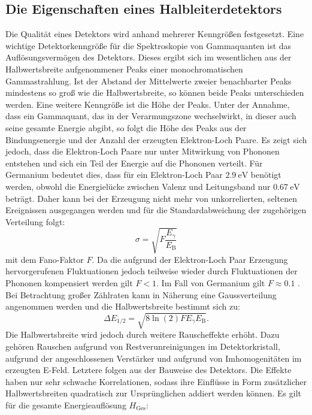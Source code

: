 \subsection{Die Eigenschaften eines Halbleiterdetektors}%
Die Qualität eines Detektors wird anhand mehrerer Kenngrößen festgesetzt.
Eine wichtige Detektorkenngröße für die Spektroskopie von Gammaquanten ist das Auflösungsvermögen des Detektors. Dieses ergibt sich im wesentlichen aus der Halbwertsbreite aufgenommener Peaks einer monochromatischen Gammastrahlung. Ist der Abstand der Mittelwerte zweier benachbarter Peaks mindestens so groß wie die Halbwertsbreite, so können beide Peaks unterschieden werden. Eine weitere Kenngröße ist die Höhe der Peaks. Unter der Annahme, dass ein Gammaquant, das in der Verarmungszone wechselwirkt, in dieser auch seine gesamte Energie abgibt, so folgt die Höhe des Peaks aus der Bindungsenergie und der Anzahl der erzeugten Elektron-Loch Paare. Es zeigt sich jedoch, dass die Elektron-Loch Paare nur unter Mitwirkung von Phononen entstehen und sich ein Teil der Energie auf die Phononen verteilt. Für Germanium bedeutet dies, dass für ein Elektron-Loch Paar $\SI{2.9}{\electronvolt}$ benötigt werden, obwohl die Energielücke zwischen Valenz und Leitungsband nur $\SI{0.67}{\electronvolt}$ beträgt. Daher kann bei der Erzeugung nicht mehr von unkorrelierten, seltenen Ereignissen ausgegangen werden und für die Standardabweichung der zugehörigen Verteilung folgt:
\begin{equation}
\sigma = \sqrt{F \frac{E_\gamma}{E_\text{B}} }
\end{equation}
mit dem Fano-Faktor $F$. Da die aufgrund der Elektron-Loch Paar Erzeugung hervorgerufenen Fluktuationen jedoch teilweise wieder durch Fluktuationen der Phononen kompensiert werden gilt $F < 1$. Im Fall von Germanium gilt $F \approx 0.1$ \cite{V18}. Bei Betrachtung großer Zählraten kann in Näherung eine Gaussverteilung angenommen werden und die Halbwertsbreite bestimmt sich zu:
\begin{equation}
\Delta E_\text{1/2} = \sqrt{8 \ln(2) F E_\gamma E_\text{B}} \label{eq:deltE}.
\end{equation}
Die Halbwertsbreite wird jedoch durch weitere Rauscheffekte erhöht. Dazu gehören Rauschen aufgrund von Restverunreinigungen im Detektorkristall, aufgrund der angeschlossenen Verstärker und aufgrund von Imhomogenitäten im erzeugten E-Feld. Letztere folgen aus der Bauweise des Detektors. Die Effekte haben nur sehr schwache Korrelationen, sodass ihre Einflüsse in Form zusätzlicher Halbwertsbreiten quadratisch zur Ursprünglichen addiert werden können. Es gilt für die gesamte Energieauflösung $H_\text{Ges}$:
